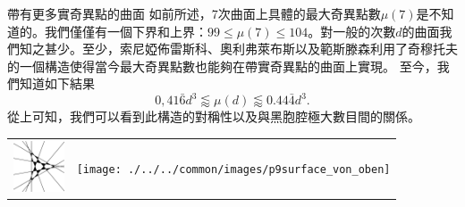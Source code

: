 \begin{surferPage}[216奇異點]{帶有更多實奇異點的曲面}
如前所述，7次曲面上具體的最大奇異點數$\mu(7)$是不知道的。我們僅僅有一個下界和上界：$99\le \mu(7) \le 104$。對一般的次數$d$的曲面我們知之甚少。至少，索尼婭佈雷斯科、奧利弗萊布斯以及範斯滕森利用了奇穆托夫的一個構造使得當今最大奇異點數也能夠在帶實奇異點的曲面上實現。
至今，我們知道如下結果\[0,41\bar{6}d^3 \lessapprox \mu(d) \lessapprox 0.44\bar{4} d^3.\]
從上可知，我們可以看到此構造的對稱性以及與黑胞腔極大數目間的關係。
 \begin{center}
      \begin{tabular}{c@{\qquad}c}
        \includegraphics[height=1.5cm]{./../../common/images/vielesing.pdf}
        &
        \texttt{[image: ./../../common/images/p9surface\_von\_oben]}
      \end{tabular}
    \end{center}
\end{surferPage}

